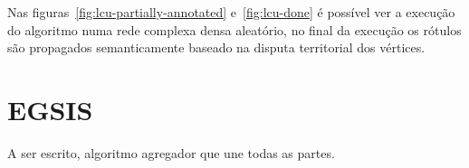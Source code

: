 Nas figuras~\ref{fig:lcu-partially-annotated} e~\ref{fig:lcu-done} é
possível ver a execução do algoritmo numa rede complexa densa
aleatório, no final da execução os rótulos são propagados
semanticamente baseado na disputa territorial dos vértices.


\section{EGSIS}\label{sec:teorica-egsis}

A ser escrito, algoritmo agregador que une todas as partes.
